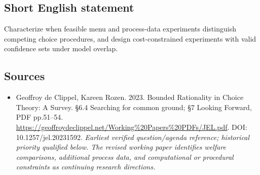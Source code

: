 \documentclass[11pt]{article}
\begin{document}
\subsection{Short English statement}
Characterize when feasible menu and process-data experiments distinguish competing choice procedures, and design cost-constrained experiments with valid confidence sets under model overlap.

\subsection{Sources}
\begin{itemize}\raggedright
\item[\textnormal{[S1]}]\hypertarget{source:30007555:1}{} Geoffroy de Clippel, Kareen Rozen. 2023. Bounded Rationality in Choice Theory: A Survey. §6.4 Searching for common ground; §7 Looking Forward, PDF pp.51–54.
\url{https://geoffroydeclippel.net/Working%20Papers%20PDFs/JEL.pdf}.
DOI: 10.1257/jel.20231592.
{\small\textit{Earliest verified question/agenda reference; historical priority qualified below. The revised working paper identifies welfare comparisons, additional process data, and computational or procedural constraints as continuing research directions.}}
\end{itemize}
\end{document}
